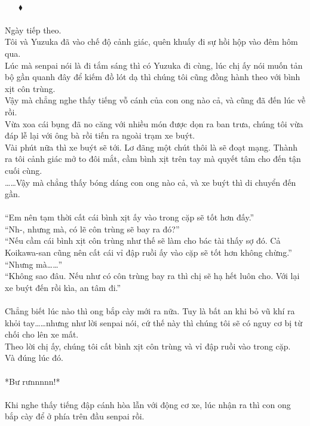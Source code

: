 \documentclass[12pt,a4paper, twosides]{book}
\begin{document}
\\
     $\mathbin{\blacklozenge}$\\
\\
Ngày tiếp theo.\\
Tôi và Yuzuka đã vào chế độ cảnh giác, quên khuấy đi sự hồi hộp vào đêm hôm qua.\\
Lúc mà senpai nói là đi tắm sáng thì có Yuzuka đi cùng, lúc chị ấy nói muốn tản bộ gần quanh đây để kiếm đồ lót dạ thì chúng tôi cũng đồng hành theo với bình xịt côn trùng.\\
Vậy mà chẳng nghe thấy tiếng vỗ cánh của con ong nào cả, và cũng đã đến lúc về rồi.\\
Vừa xoa cái bụng đã no căng với nhiều món được dọn ra ban trưa, chúng tôi vừa đáp lễ lại với ông bà rồi tiến ra ngoài trạm xe buýt.\\
Vài phút nữa thì xe buýt sẽ tới. Lơ đãng một chút thôi là sẽ đoạt mạng. Thành ra tôi cảnh giác mở to đôi mắt, cầm bình xịt trên tay mà quyết tâm cho đến tận cuối cùng.\\
……Vậy mà chẳng thấy bóng dáng con ong nào cả, và xe buýt thì di chuyển đến gần.\\
\\
“Em nên tạm thời cất cái bình xịt ấy vào trong cặp sẽ tốt hơn đấy.”\\
“Nh-, nhưng mà, có lẽ côn trùng sẽ bay ra đó?”\\
“Nếu cầm cái bình xịt côn trùng như thế sẽ làm cho bác tài thấy sợ đó. Cả Koikawa-san cũng nên cất cái vỉ đập ruồi ấy vào cặp sẽ tốt hơn không chừng.”\\
“Nhưng mà……”\\
“Không sao đâu. Nếu như có côn trùng bay ra thì chị sẽ hạ hết luôn cho. Với lại xe buýt đến rồi kìa, an tâm đi.”\\
\\
Chẳng biết lúc nào thì ong bắp cày mới ra nữa. Tuy là bất an khi bỏ vũ khí ra khỏi tay……nhưng như lời senpai nói, cứ thế này thì chúng tôi sẽ có nguy cơ bị từ chối cho lên xe mất.\\
Theo lời chị ấy, chúng tôi cất bình xịt côn trùng và vỉ đập ruồi vào trong cặp.\\
Và đúng lúc đó.\\
\\
*Bư rưnnnnn!*\\
\\
Khi nghe thấy tiếng đập cánh hòa lẫn với động cơ xe, lúc nhận ra thì con ong bắp cày để ở phía trên đầu senpai rồi.\\
\\
\end{document}
